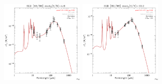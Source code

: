 \documentclass[preprint2,longabstract]{aastex}
\begin{document}
\begin{figure}
    \includegraphics[trim=0 2mm 0 0, clip, width=40mm]{../SEDs/sed_59.pdf}
	\includegraphics[trim=0 2mm 0 0, clip, width=40mm]{../SEDs/sed_60.pdf}
\end{figure}
\end{document}
